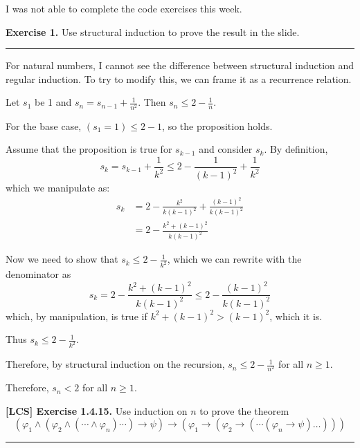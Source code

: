 \documentclass{article}
\newcommand*{\Break}{\vspace{0.2cm}\hrule{}\vspace{0.2cm}}
\newcommand*{\parens}[1]{\left( #1 \right)}
\begin{document}
 \maketitle

I was not able to complete the code exercises this week.

\vspace{1in}

\noindent\textbf{Exercise 1.} Use structural induction to prove the result
in the slide.

\Break{}

For natural numbers, I cannot see the difference between structural induction
and regular induction. To try to modify this, we can frame it as a recurrence
relation.

Let $s_1$ be 1 and $s_n = s_{n-1} + \frac{1}{n^2}$. Then $s_n \leq
	2 - \frac{1}{n}$.

For the base case, $(s_1 = 1) \leq 2 - 1$, so the proposition holds.

Assume that the proposition is true for $s_{k-1}$ and consider $s_k$. By
definition,
\[
	s_k = s_{k-1} + \frac{1}{k^2} \leq 2 - \frac{1}{(k-1)^2} + \frac{1}{k^2}
\]
which we manipulate as:
\begin{align*}
	s_k & = 2 - \frac{k^2}{k(k-1)^2} + \frac{(k-1)^2}{k(k-1)^2} \\
	    & = 2 - \frac{k^2 + (k - 1)^2}{k(k-1)^2}
\end{align*}

Now we need to show that $s_k \leq 2 - \frac{1}{k^2}$, which we can rewrite
with the denominator as
\[
	s_k = 2 - \frac{k^2 + (k - 1)^2}{k(k-1)^2} \leq 2 - \frac{(k-1)^2}{k(k-1)^2}
\]
which, by manipulation, is true if $k^2 + (k-1)^2 > (k-1)^2$, which it is.

Thus $s_k \leq 2 - \frac{1}{k^2}$.

Therefore, by structural induction on the recursion, $s_n \leq 2 - \frac{1}{n^2}$ for
all $n \geq 1$.

Therefore, $s_n < 2$ for all $n \geq 1$.



\newpage{}



\noindent\textbf{[LCS] Exercise 1.4.15.} Use induction on $n$ to prove the theorem
\[
	\parens{\varphi_1 \wedge \parens{\varphi_2 \wedge \parens{\cdots \wedge \varphi_n} \cdots } \to \psi }
	\to \parens{\varphi_1 \to \parens{\varphi_2 \to \parens{\cdots \parens{\varphi_n \to \psi } \dots } } }
\]

\Break
\end{document}
